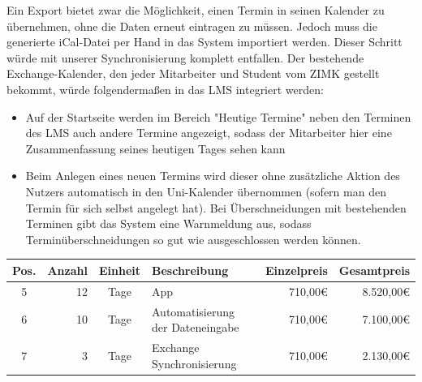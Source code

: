 \documentclass[10pt,a4paper]{article}
\begin{document}
Ein Export bietet zwar die Möglichkeit, einen Termin in seinen Kalender zu übernehmen, ohne die Daten erneut eintragen zu müssen. Jedoch muss die generierte iCal-Datei per Hand in das System importiert werden. Dieser Schritt würde mit unserer Synchronisierung komplett entfallen. Der bestehende Exchange-Kalender, den jeder Mitarbeiter und Student vom ZIMK gestellt bekommt, würde folgendermaßen in das LMS integriert werden:
\begin{itemize}
	\item Auf der Startseite werden im Bereich "Heutige Termine" neben den Terminen des LMS auch andere Termine angezeigt, sodass der Mitarbeiter hier eine Zusammenfassung seines heutigen Tages sehen kann
	\item Beim Anlegen eines neuen Termins wird dieser ohne zusätzliche Aktion des Nutzers automatisch in den Uni-Kalender übernommen (sofern man den Termin für sich selbst angelegt hat). Bei Überschneidungen mit bestehenden Terminen gibt das System eine Warnmeldung aus, sodass Terminüberschneidungen so gut wie ausgeschlossen werden können.
\end{itemize}

\vspace{20pt}
\hspace{-45pt}
\begin{tabular}{|c|r|c|l|r|r|}
	\hline
	Pos. & Anzahl & Einheit & Beschreibung & Einzelpreis & Gesamtpreis \\
	\hline	
	5 & 12 & Tage & App & 710,00\euro{} & 8.520,00\euro{} \\
	6 & 10 & Tage & Automatisierung der Dateneingabe & 710,00\euro{} & 7.100,00\euro{} \\
	7 & 3 & Tage & Exchange Synchronisierung & 710,00\euro{} & 2.130,00\euro{} \\	
	\hline

\end{tabular}
\end{document}
